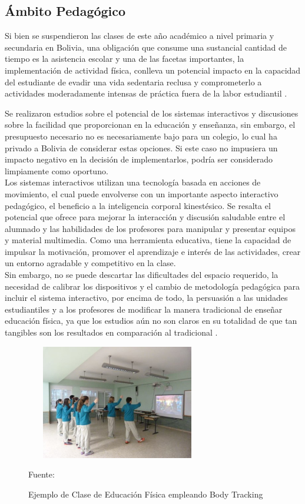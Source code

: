 \subsection{Ámbito Pedagógico}

Si bien se suspendieron las clases de este año académico a nivel primaria y secundaria en Bolivia, una obligación que consume una sustancial cantidad de tiempo es la asistencia escolar y una de las facetas importantes, la implementación de actividad física, conlleva un potencial impacto en la capacidad del estudiante de evadir una vida sedentaria reclusa y comprometerlo a actividades moderadamente intensas de práctica fuera de la labor estudiantil \cite{daly2018systematic}.

Se realizaron estudios sobre el potencial de los sistemas interactivos y discusiones sobre la facilidad que proporcionan en la educación y enseñanza, sin embargo, el presupuesto necesario no es necesariamente bajo para un colegio, lo cual ha privado a Bolivia de considerar estas opciones. Si este caso no impusiera un impacto negativo en la decisión de implementarlos, podría ser considerado limpiamente como oportuno.\\

Los sistemas interactivos utilizan una tecnología basada en acciones de movimiento, el cual puede envolverse con un importante aspecto interactivo pedagógico, el beneficio a la inteligencia corporal kinestésico. Se resalta el potencial que ofrece para mejorar la interacción y discusión saludable entre el alumnado y las habilidades de los profesores para manipular y presentar equipos y material multimedia. Como una herramienta educativa, tiene la capacidad de impulsar la motivación, promover el aprendizaje e interés de las actividades, crear un entorno agradable y competitivo en la clase\cite{pirie1995meaning}.\\

Sin embargo, no se puede descartar las dificultades del espacio requerido, la necesidad de calibrar los dispositivos y el cambio de metodología pedagógica para incluir el sistema interactivo, por encima de todo, la persuasión a las unidades estudiantiles y a los profesores de modificar la manera tradicional de enseñar educación física, ya que los estudios aún no son claros en su totalidad de que tan tangibles son los resultados en comparación al tradicional \cite{daly2018systematic}. \\
\begin{figure}[t!]
	\centering
	\includegraphics[width=8cm,height=5cm,]{./Images/kinectexampleschool.jpg}
	\caption{Ejemplo de Clase de Educación Física empleando Body Tracking}
	\footnotesize Fuente: \cite{kinectexampleschool}
	\label{claseEF}
\end{figure}

